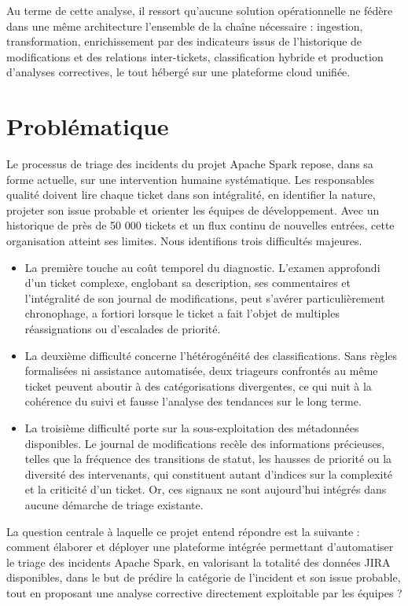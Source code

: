 Au terme de cette analyse, il ressort qu'aucune solution opérationnelle ne fédère dans une même architecture l'ensemble de la chaîne nécessaire : ingestion, transformation, enrichissement par des indicateurs issus de l'historique de modifications et des relations inter-tickets, classification hybride et production d'analyses correctives, le tout hébergé sur une plateforme cloud unifiée.

\section{Problématique}
Le processus de triage des incidents du projet Apache Spark repose, dans sa forme actuelle, sur une intervention humaine systématique. Les responsables qualité doivent lire chaque ticket dans son intégralité, en identifier la nature, projeter son issue probable et orienter les équipes de développement. Avec un historique de près de 50 000 tickets et un flux continu de nouvelles entrées, cette organisation atteint ses limites. Nous identifions trois difficultés majeures.

\begin{itemize}
    \item La première touche au coût temporel du diagnostic. L'examen approfondi d'un ticket complexe, englobant sa description, ses commentaires et l'intégralité de son journal de modifications, peut s'avérer particulièrement chronophage, a fortiori lorsque le ticket a fait l'objet de multiples réassignations ou d'escalades de priorité.
    \item La deuxième difficulté concerne l'hétérogénéité des classifications. Sans règles formalisées ni assistance automatisée, deux triageurs confrontés au même ticket peuvent aboutir à des catégorisations divergentes, ce qui nuit à la cohérence du suivi et fausse l'analyse des tendances sur le long terme.
    \item La troisième difficulté porte sur la sous-exploitation des métadonnées disponibles. Le journal de modifications recèle des informations précieuses, telles que la fréquence des transitions de statut, les hausses de priorité ou la diversité des intervenants, qui constituent autant d'indices sur la complexité et la criticité d'un ticket. Or, ces signaux ne sont aujourd'hui intégrés dans aucune démarche de triage existante.
\end{itemize}

La question centrale à laquelle ce projet entend répondre est la suivante : comment élaborer et déployer une plateforme intégrée permettant d'automatiser le triage des incidents Apache Spark, en valorisant la totalité des données JIRA disponibles, dans le but de prédire la catégorie de l'incident et son issue probable, tout en proposant une analyse corrective directement exploitable par les équipes ?


